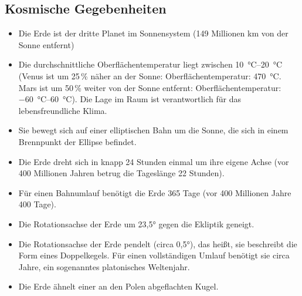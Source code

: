 \subsection{Kosmische Gegebenheiten}
\begin{itemize}
	\item Die Erde ist der dritte Planet im Sonnensystem (149 Millionen \si{\kilo\metre} von der Sonne entfernt)
	\item Die durchschnittliche Oberflächentemperatur liegt zwischen \SIrange{10}{20}{\celsius}
	  (Venus ist um 25\,\% näher an der Sonne:
	  Oberflächentemperatur: \SI{470}{\celsius}. Mars ist um 50\,\% weiter von der Sonne entfernt:
	  Oberflächentemperatur: \SIrange{-60}{60}{\celsius}).
	  Die Lage im Raum ist verantwortlich für das lebensfreundliche Klima.
	\item Sie bewegt sich auf einer elliptischen Bahn um die Sonne, die sich in einem Brennpunkt der Ellipse befindet.
	\item Die Erde dreht sich in knapp 24 Stunden einmal um ihre eigene Achse
	  (vor 400 Millionen Jahren betrug die Tageslänge 22 Stunden).
	\item Für einen Bahnumlauf benötigt die Erde 365 Tage (vor 400 Millionen Jahre 400 Tage).
	\item Die Rotationsachse der Erde um \ang{23,5} gegen die Ekliptik geneigt.
	\item Die Rotationsachse der Erde pendelt (circa \ang{0,5}), das heißt, sie beschreibt die Form eines Doppelkegels.
	  Für einen vollständigen Umlauf benötigt sie circa  Jahre, ein sogenanntes platonisches Weltenjahr.
	\item Die Erde ähnelt einer an den Polen abgeflachten Kugel.
\end{itemize}

